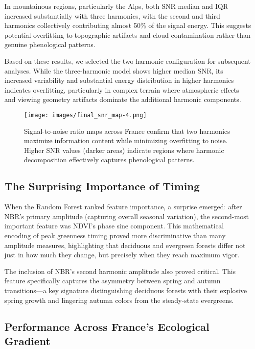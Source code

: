 \documentclass[utf8]{FrontiersinHarvard}
\begin{document}
In mountainous regions, particularly the Alps, both SNR median and IQR increased substantially with three harmonics, with the second and third harmonics collectively contributing almost 50\% of the signal energy. This suggests potential overfitting to topographic artifacts and cloud contamination rather than genuine phenological patterns.

Based on these results, we selected the two-harmonic configuration for subsequent analyses. While the three-harmonic model shows higher median SNR, its increased variability and substantial energy distribution in higher harmonics indicates overfitting, particularly in complex terrain where atmospheric effects and viewing geometry artifacts dominate the additional harmonic components.

\begin{figure}[H]
    \centering
    \texttt{[image: images/final\_snr\_map-4.png]}
    \caption{Signal-to-noise ratio maps across France confirm that two harmonics maximize information content while minimizing overfitting to noise. Higher SNR values (darker areas) indicate regions where harmonic decomposition effectively captures phenological patterns.}
    \label{fig:snr_maps}
\end{figure}

\subsection{The Surprising Importance of Timing}

When the Random Forest ranked feature importance, a surprise emerged: after NBR's primary amplitude (capturing overall seasonal variation), the second-most important feature was NDVI's phase sine component. This mathematical encoding of peak greenness timing proved more discriminative than many amplitude measures, highlighting that deciduous and evergreen forests differ not just in how much they change, but precisely when they reach maximum vigor.

The inclusion of NBR's second harmonic amplitude also proved critical. This feature specifically captures the asymmetry between spring and autumn transitions—a key signature distinguishing deciduous forests with their explosive spring growth and lingering autumn colors from the steady-state evergreens.

\subsection{Performance Across France's Ecological Gradient}
\end{document}

